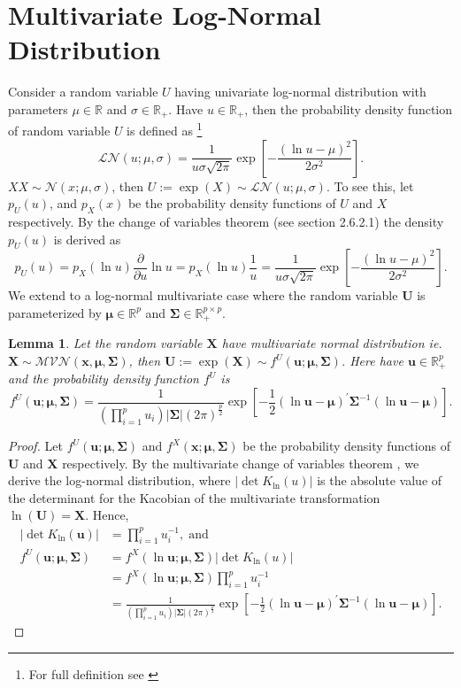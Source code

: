 \documentclass[12pt,letterpaper]{article}
\numberwithin{equation}{section}
\numberwithin{equation}{section}
\numberwithin{equation}{section}
\newtheorem{lemma}[theorem]{Lemma}
\begin{document}
\section{Multivariate Log-Normal Distribution }
Consider a random variable $U$ having univariate log-normal distribution with parameters $\mu \in \mathbb{R}$ and $\sigma \in \mathbb{R}_+ $. Have $u \in \mathbb{R}_+$, then the probability density function of random variable $U$ is defined as \footnote{For full definition see \cite{johnson1995continuous}}
$$\mathcal{LN}(u; \mu, \sigma) = \frac{1}{u\sigma\sqrt{2\pi}}\exp\left[-\frac{(\ln u - \mu)^2}{2\sigma^2}	\right].$$
$X$$ X \sim \mathcal{N}(x; \mu, \sigma) $, then $U := \exp{(X)}\sim \mathcal{LN}(u; \mu, \sigma) $.
To see this, let $p_U(u)$, and $ p_X(x) $ be the probability density functions of $U$ and $X$ respectively. By the change of variables theorem (see \cite{murphy2012machine} section 2.6.2.1) the density $p_U(u)$ is derived as
$$p_U(u) = p_X(\ln u )\frac{\partial}{\partial u} \ln u  =  p_X(\ln u ) \frac{1}{u} =  \frac{1}{u\sigma\sqrt{2\pi}}\exp\left[-\frac{(\ln u - \mu)^2}{2\sigma^2}	\right].$$\newline
 We extend to a log-normal multivariate case where the random variable $\bm{U} $ is parameterized by $ \bm{\mu} \in \mathbb{R}^p$ and $\bm{\Sigma} \in  \mathbb{R}_{+}^{p \times p} \label{changeVarUni} $.
\begin{lemma}
Let the random variable $\bm{X}$ have multivariate normal distribution ie. $\bm{X} \sim \mathcal{MVN}(\bm{x}, \bm{\mu},\bm{\Sigma}) $, then $\bm{U} := \exp(\bm{X} ) \sim  f^U(\bm{u}; \bm{\mu } , \bm{\Sigma} )$. Here
have $\bm{u} \in \mathbb{R}_{+}^p $ and the probability density function $f^U$ is
$$ f^U(\bm{u}; \bm{\mu } , \bm{\Sigma} )= \frac{1}{(\prod_{i=1}^{p}u_{i})| \bm{\Sigma} |(2 \pi)^{\frac{p}{2}}}   \exp\left[-\frac{1}{2}(\ln \bm{u} -\bm{\mu})^{'}  \bm{\Sigma}^{-1}(\ln \bm{u} -\bm{\mu})\right].  $$
\end{lemma}
\begin{proof}
Let $f^U(\bm{u}; \bm{\mu},\bm{\Sigma})$ and $f^X(\bm{x}; \bm{\mu},\bm{\Sigma})$ be the probability density functions of $\bm{U}$ and $\bm{X}$ respectively. By the multivariate change of variables theorem \citep[see][Section~2.6.2.1]{murphy2012machine}, we derive the log-normal distribution, where $ | \det K_{\ln} (u) | $ is the absolute value of the determinant for the Kacobian of the multivariate transformation $\ln(\bm{U}) = \bm{X} $. Hence,
\begin{align*}
 | \det K_{\ln} (\bm{u}) | & = \prod_{i=1}^p u_i^{-1}, \; \text{and} \; \\
   f^U(\bm{u}; \bm{\mu},\bm{\Sigma})  & =  f^X(\ln \bm{u}; \bm{\mu},\bm{\Sigma})  | \det K_{\ln} (u) | \\
  & = f^X(\ln \bm{u}; \bm{\mu},\bm{\Sigma})\prod_{i=1}^p u_i^{-1} \\
  & =  \frac{1}{(\prod_{i=1}^{p}u_{i})| \bm{\Sigma} |(2 \pi)^{\frac{p}{2}}}   \exp\left[-\frac{1}{2}(\ln \bm{u} -\bm{\mu})^{'}  \bm{\Sigma}^{-1}(\ln \bm{u} -\bm{\mu})\right].
  \end{align*}
\end{proof}
\end{document}
